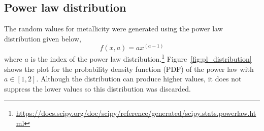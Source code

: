 \subsection{Power law distribution}
\label{subsec:power-law-distribution}
The random values for metallicity were generated using the power law distribution given below,
\begin{equation}
    f(x, a) = ax^{(a-1)}
    \label{eq:powerlaw_distribution}
\end{equation}
where $a$ is the index of the power law distribution.\footnote{\url{https://docs.scipy.org/doc/scipy/reference/generated/scipy.stats.powerlaw.html}}
Figure~\ref{fig:pl_distribution} shows the plot for the probability density function (PDF) of the power law with $a \in [1, 2]$.
Although the distribution can produce higher values, it does not suppress the lower values so this distribution was discarded.

